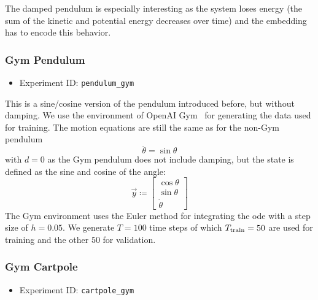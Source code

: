 			The damped pendulum is especially interesting as the system loses energy (\ie the sum of the kinetic and potential energy decreases over time) and the embedding has to encode this behavior.

		\subsubsection{Gym Pendulum}
			\label{subsubsec:gymPendulum}

			\begin{itemize}
				\item Experiment ID: \texttt{pendulum\_gym}
			\end{itemize}

			This is a sine/cosine version of the pendulum introduced before, but without damping. We use the environment of OpenAI Gym~\cite{brockmanOpenAIGym2016} for generating the data used for training. The motion equations are still the same as for the non-Gym pendulum
			\begin{equation*}
				\ddot{\theta} = \sin\theta
			\end{equation*}
			with \( d = 0 \) as the Gym pendulum does not include damping, but the state is defined as the sine and cosine of the angle:
			\begin{equation*}
				\vec{y} \coloneqq
					\begin{bmatrix}
						\cos\theta \\
						\sin\theta \\
						\dot{\theta}
					\end{bmatrix}
			\end{equation*}
			The Gym environment uses the Euler method for integrating the \ac{ode} with a step size of \( h = 0.05 \). We generate \( T = 100 \) time steps of which \( T_{\mathrm{train}} = 50 \) are used for training and the other \(50\) for validation.

		\subsubsection{Gym Cartpole}
			\label{subsubsec:cartpole}

			\begin{itemize}
				\item Experiment ID: \texttt{cartpole\_gym}
			\end{itemize}


